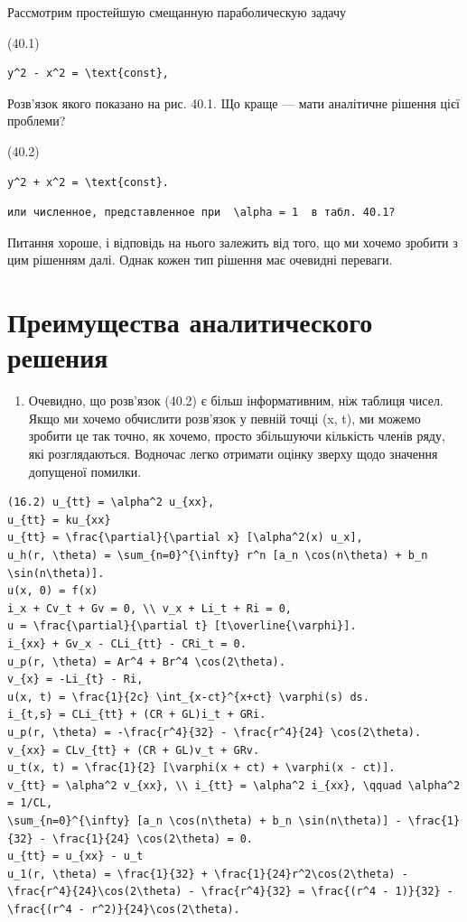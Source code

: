 \documentclass[
  ukrainian,
]{article}
\providecommand{\tightlist}{%
  \setlength{\itemsep}{0pt}\setlength{\parskip}{0pt}}
\begin{document}
Рассмотрим простейшую смещанную параболическую задачу

(40.1)

\begin{verbatim}
y^2 - x^2 = \text{const},
\end{verbatim}

Розв'язок якого показано на рис. 40.1. Що краще --- мати аналітичне
рішення цієї проблеми?

(40.2)

\begin{verbatim}
y^2 + x^2 = \text{const}.
\end{verbatim}

\begin{verbatim}
или численное, представленное при  \alpha = 1  в табл. 40.1?
\end{verbatim}

Питання хороше, і відповідь на нього залежить від того, що ми хочемо
зробити з цим рішенням далі. Однак кожен тип рішення має очевидні
переваги.

\section{Преимущества аналитического
решения}\label{ux43fux440ux435ux438ux43cux443ux449ux435ux441ux442ux432ux430-ux430ux43dux430ux43bux438ux442ux438ux447ux435ux441ux43aux43eux433ux43e-ux440ux435ux448ux435ux43dux438ux44f}

\begin{enumerate}
\def\labelenumi{\arabic{enumi}.}
\tightlist
\item
  Очевидно, що розв'язок (40.2) є більш інформативним, ніж таблиця
  чисел. Якщо ми хочемо обчислити розв'язок у певній точці (x, t), ми
  можемо зробити це так точно, як хочемо, просто збільшуючи кількість
  членів ряду, які розглядаються. Водночас легко отримати оцінку зверху
  щодо значення допущеної помилки.
\end{enumerate}

\begin{verbatim}
(16.2) u_{tt} = \alpha^2 u_{xx},
u_{tt} = ku_{xx}
u_{tt} = \frac{\partial}{\partial x} [\alpha^2(x) u_x],
u_h(r, \theta) = \sum_{n=0}^{\infty} r^n [a_n \cos(n\theta) + b_n \sin(n\theta)].
u(x, 0) = f(x)
i_x + Cv_t + Gv = 0, \\ v_x + Li_t + Ri = 0,
u = \frac{\partial}{\partial t} [t\overline{\varphi}].
i_{xx} + Gv_x - CLi_{tt} - CRi_t = 0.
u_p(r, \theta) = Ar^4 + Br^4 \cos(2\theta).
v_{x} = -Li_{t} - Ri,
u(x, t) = \frac{1}{2c} \int_{x-ct}^{x+ct} \varphi(s) ds.
i_{t,s} = CLi_{tt} + (CR + GL)i_t + GRi.
u_p(r, \theta) = -\frac{r^4}{32} - \frac{r^4}{24} \cos(2\theta).
v_{xx} = CLv_{tt} + (CR + GL)v_t + GRv.
u_t(x, t) = \frac{1}{2} [\varphi(x + ct) + \varphi(x - ct)].
v_{tt} = \alpha^2 v_{xx}, \\ i_{tt} = \alpha^2 i_{xx}, \qquad \alpha^2 = 1/CL,
\sum_{n=0}^{\infty} [a_n \cos(n\theta) + b_n \sin(n\theta)] - \frac{1}{32} - \frac{1}{24} \cos(2\theta) = 0.
u_{tt} = u_{xx} - u_t
u_1(r, \theta) = \frac{1}{32} + \frac{1}{24}r^2\cos(2\theta) - \frac{r^4}{24}\cos(2\theta) - \frac{r^4}{32} = \frac{(r^4 - 1)}{32} - \frac{(r^4 - r^2)}{24}\cos(2\theta).
\end{verbatim}
\end{document}
